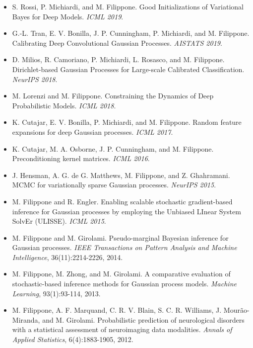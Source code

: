 \documentclass[oneside, a4paper, onecolumn, 10pt]{article}
\begin{document}
\begin{itemize}
\item  S. Rossi, P. Michiardi, and M. Filippone. Good Initializations of Variational Bayes for Deep Models. \emph{ICML 2019}.  
\item  G.-L. Tran, E. V. Bonilla, J. P. Cunningham, P. Michiardi, and M. Filippone. Calibrating Deep Convolutional Gaussian Processes. \emph{AISTATS 2019}.  
\item  D. Milios, R. Camoriano, P. Michiardi, L. Rosasco, and M. Filippone. Dirichlet-based Gaussian Processes for Large-scale Calibrated Classification. \emph{NeurIPS 2018}. 
\item  M. Lorenzi and M. Filippone. Constraining the Dynamics of Deep Probabilistic Models. \emph{ICML 2018}.  
\item  K. Cutajar, E. V. Bonilla, P. Michiardi, and M. Filippone. Random feature expansions for deep Gaussian processes. \emph{ICML 2017}.  
\item  K. Cutajar, M. A. Osborne, J. P. Cunningham, and M. Filippone. Preconditioning kernel matrices. \emph{ICML 2016}.  
\item  J. Hensman, A. G. de G. Matthews, M. Filippone, and Z. Ghahramani. MCMC for variationally sparse Gaussian processes. \emph{NeurIPS 2015}.
\item  M. Filippone and R. Engler. Enabling scalable stochastic gradient-based inference for Gaussian processes by employing the Unbiased LInear System SolvEr (ULISSE). \emph{ICML 2015}.  
\item  M. Filippone and M. Girolami. Pseudo-marginal Bayesian inference for Gaussian processes. \emph{IEEE Transactions on Pattern Analysis and Machine Intelligence}, 36(11):2214-2226, 2014.  
\item  M. Filippone, M. Zhong, and M. Girolami. A comparative evaluation of stochastic-based inference methods for Gaussian process models. \emph{Machine Learning}, 93(1):93-114, 2013.  
\item  M. Filippone, A. F. Marquand, C. R. V. Blain, S. C. R. Williams, J. Mour\~ao-Miranda, and M. Girolami. Probabilistic prediction of neurological disorders with a statistical assessment of neuroimaging data modalities. \emph{Annals of Applied Statistics}, 6(4):1883-1905, 2012.  

\end{itemize}
\end{document}
